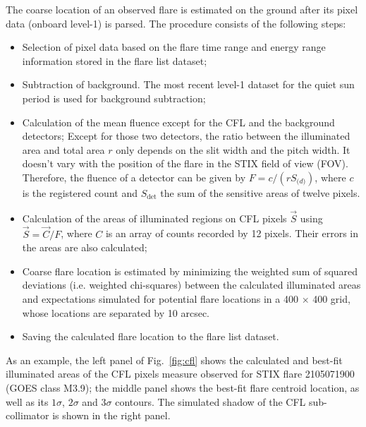 \documentclass[referee]{aa} %
\begin{document}
The coarse location of an observed flare is estimated on the ground after its pixel data (onboard level-1) is parsed.
The procedure consists of the following steps:
\begin{itemize}
  \item Selection of pixel data based on the flare time range and energy range information stored in the flare list dataset;
  \item Subtraction of background. The most recent level-1 dataset for the quiet sun period is used for background subtraction;
  \item Calculation of the mean fluence except for the CFL and the background detectors; 
      Except for those two detectors, the ratio between the illuminated area and total area $r$ only depends on the 
      slit width and the pitch width. It doesn't vary with the position of the flare in the STIX field of view (FOV).  
      Therefore, the fluence of a detector can be given by $F=c/(r S_{\mathrm(d)})$,  where $c$ is the registered 
      count and $S_\textrm{det}$ the sum of the sensitive areas of twelve pixels. 
  \item Calculation of the areas of illuminated regions on CFL pixels $\vec{S}$ using $\vec{S} = \vec{C}/F$, where $C$  is an array of counts 
  recorded by 12 pixels. Their errors in the areas are also calculated; 
  \item  Coarse flare location is estimated by minimizing the weighted sum of squared deviations 
  (i.e. weighted chi-squares) between the calculated illuminated areas and expectations
  simulated for potential flare locations in a 400 $\times$ 400 grid, whose locations are separated by 10 arcsec.  
  \item Saving the calculated flare location to the flare list dataset. 
\end{itemize}
As an example, the left panel of Fig.~\ref{fig:cfl} shows the calculated and best-fit illuminated areas 
of the CFL pixels measure observed for STIX flare 2105071900 (GOES class M3.9);   the middle panel shows the best-fit 
flare centroid location, as well as its $1\sigma$, $2\sigma$ and $3\sigma$ contours. 
The simulated shadow of the CFL sub-collimator is shown in the right panel. 
\end{document}
